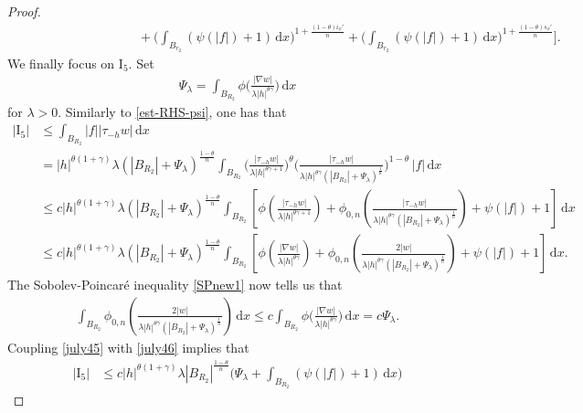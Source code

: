 \documentclass[leqno,11pt]{amsart}%
\numberwithin{equation}{section}
\def\d{\mathrm{d}}
\def\dx{\d x}
\theoremstyle{definition}
\numberwithin{equation}{section}
\begin{document}
\begin{proof}
\begin{align}
     &
     \qquad\qquad\qquad\qquad\quad+\bigg(\int_{B_{r_2}}(\psi(|f|)+1)\,\dx\bigg)^{1+\frac{(1-\theta) i_\phi'}{n}}
     +
     \bigg(\int_{B_{r_2}}(\psi(|f|)+1)\,\dx\bigg)^{1+\frac{(1-\theta) s_\phi'}{n}}
 \Bigg].
\end{align}
We finally focus on $\mathrm{I}_5$.  Set
\begin{align}
    \label{Psi}
    \Psi_\lambda= \int_{B_{R_2}}\phi\bigg(\frac{|\nabla w|}{\lambda|h|^{{\theta\gamma}}}\bigg)\, \d x
\end{align}
for $\lambda >0$.
Similarly to \eqref{est-RHS-psi}, one has that
\begin{align}\label{july45}
|\mathrm{I}_5| &\leq \int_{B_{R_2}} |f| |\tau_{-h}w|\,\dx    
\\ 
\nonumber
    &=
      |h|^{{\theta(1+\gamma)}} \lambda (|B_{R_2}| +\Psi_\lambda)^{\frac{1-\theta}{n}}
\int_{B_{R_2}}\Big(\frac{|\tau_{-h}w|}{\lambda|h|^{ {\theta\gamma}+1}}\Big)^{\theta}\Big(\frac{|\tau_{-h}w|}{\lambda|h|^{{\theta\gamma}}(|B_{R_2}|  +\Psi_\lambda)^{\frac{1}{n}}}\Big)^{1-\theta}\,|f|\,\dx\\ \nonumber  
    &\le c
     |h|^{{\theta(1+\gamma)}}\lambda (|B_{R_2}| +\Psi_\lambda)^{\frac{{1-\theta}}{n}}
      \int_{B_{R_2}}
     \left[ \phi\left(\frac{|\tau_{-h}w|}{ \lambda|h|^{{\theta\gamma}+1}}\right)
  + \phi_{0,n}\left(\frac{|\tau_{-h}w|}{ \lambda|h|^{{\theta\gamma}}(|B_{R_2}| +\Psi_\lambda)^{\frac{1}{n}}}\right)
     +
     \psi(|f|) + 1\right]\,\dx \\
     \nonumber
 &\le
    c|h|^{{\theta(1+\gamma)}} \lambda (|B_{R_2}| +\Psi_\lambda)^{\frac{{1-\theta}}{n}} 
    \int_{B_{R_2}}\left[
\phi\left(\frac{|\nabla w|}{ \lambda|h|^{{\theta\gamma}}}\right)
+ \phi_{0,n}\left(\frac{2|w|}{\lambda |h|^{{\theta\gamma}}(|B_{R_2}| +\Psi_\lambda)^{\frac{1}{n}}}\right)   +
    \psi(|f|) + 1\right]\,\dx.
\end{align}
The Sobolev-Poincar\'e inequality \eqref{SPnew1} now tells us that
\begin{align}
    \label{july46}
    \int_{B_{R_2}} \phi_{0,n}\left(\frac{2|w|}{ \lambda|h|^{{\theta\gamma}}(|B_{R_2}| +\Psi_\lambda)^{\frac{1}{n}}}\right)\, \d x \leq c \int_{B_{R_2}}\phi\bigg(\frac{|\nabla w|}{\lambda|h|^{{\theta\gamma}}}\bigg)\, \d x= c \Psi_\lambda.
\end{align}
Coupling \eqref{july45} with \eqref{july46} implies that
\begin{align}
    \label{july47}
    |\mathrm{I}_5| & \leq  c|h|^{{\theta(1+\gamma)}} \lambda |B_{R_2}|^{\frac{{1-\theta}}{n}} \bigg(\Psi_\lambda+ \int_{B_{R_2}}(\psi(|f|) +1 )\, \d x\bigg)

\end{align}
\end{proof}
\end{document}
